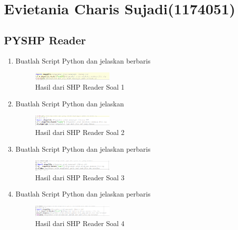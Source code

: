 \section{Evietania Charis Sujadi(1174051)}
\subsection{PYSHP Reader}
\begin{enumerate}
    \item Buatlah Script Python dan jelaskan berbaris
    
    \hfill\break
    \begin{figure}[H]
		\includegraphics[width=4cm]{figures/1174051/3/1.png}
		\centering
		\caption{Hasil dari SHP Reader Soal 1}
    \end{figure}
    
    \item Buatlah Script Python dan jelaskan
    
    \hfill\break
    \begin{figure}[H]
		\includegraphics[width=4cm]{figures/1174051/3/2.png}
		\centering
		\caption{Hasil dari SHP Reader Soal 2}
    \end{figure}
    
    \item Buatlah Script Python dan jelaskan perbaris
    
    \hfill\break
    \begin{figure}[H]
		\includegraphics[width=4cm]{figures/1174051/3/3.png}
		\centering
		\caption{Hasil dari SHP Reader Soal 3}
    \end{figure}
    
    \item Buatlah Script Python dan jelaskan perbaris
    
    \hfill\break
    \begin{figure}[H]
		\includegraphics[width=4cm]{figures/1174051/3/4.png}
		\centering
		\caption{Hasil dari SHP Reader Soal 4}
    \end{figure}
    

\end{enumerate}
